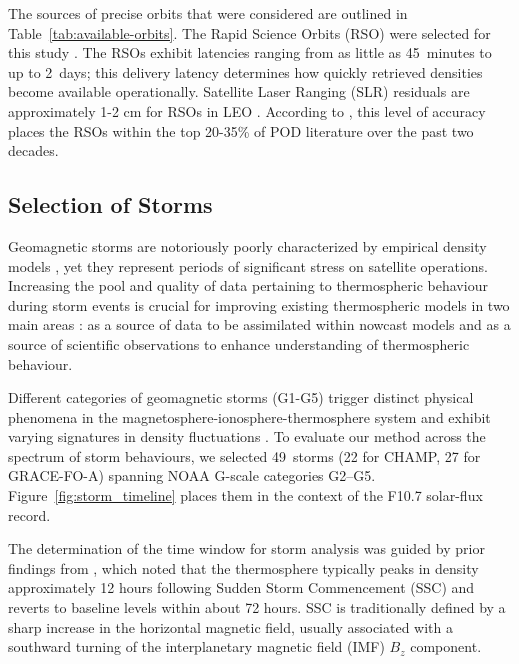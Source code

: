 \documentclass[draft]{agujournal2019}
\begin{document}
The sources of precise orbits that were considered are outlined in Table~\ref{tab:available-orbits}. The Rapid Science Orbits (RSO) were selected for this study \cite{Schreiner2022GFZProducts}. The RSOs exhibit latencies ranging from as little as 45~minutes to up to 2~days; this delivery latency determines how quickly retrieved densities become available operationally. Satellite Laser Ranging (SLR) residuals are approximately 1-2 cm for RSOs in LEO \cite{Schreiner2022GFZProducts}. According to , this level of accuracy places the RSOs within the top 20-35\% of POD literature over the past two decades.

\subsection{Selection of Storms}
Geomagnetic storms are notoriously poorly characterized by empirical density models 
\cite{Oliveira2021TheStorms, Oliveira2017ThermosphereEjections, Mutschler2023AOperations}, yet they represent periods of significant stress on satellite operations. Increasing the pool and quality of data pertaining to thermospheric behaviour during storm events is crucial for improving existing thermospheric models in two main areas \cite{Fang2022Space2022, Berger2023TheOperations}: as a source of data to be assimilated within nowcast models and as a source of scientific observations to enhance understanding of thermospheric behaviour.

Different categories of geomagnetic storms (G1-G5) \cite{NOAASWPC2024NOAAScales} trigger distinct physical phenomena in the magnetosphere-ionosphere-thermosphere system and exhibit varying signatures in density fluctuations
\cite{Knipp2021TimelinesStorms, Astafyeva2017GlobalModeling, Laskar2023ThermosphericStorm, Oliveira2017ThermosphereEjections}. To evaluate our method across the spectrum of storm behaviours, we selected 49~storms (22 for CHAMP, 27 for GRACE-FO-A) spanning NOAA G-scale categories G2--G5. Figure~\ref{fig:storm_timeline} places them in the context of the F10.7 solar-flux record.

The determination of the time window for storm analysis was guided by prior findings from , which noted that the thermosphere typically peaks in density approximately 12 hours following Sudden Storm Commencement (SSC) and reverts to baseline levels within about 72 hours. SSC is traditionally defined by a sharp increase in the horizontal magnetic field, usually associated with a southward turning of the interplanetary magnetic field (IMF) $B_z$ component.
\end{document}
